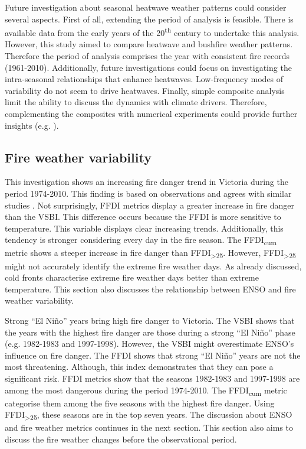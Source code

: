 Future investigation about seasonal heatwave weather patterns could
consider several aspects. First of all, extending the period of analysis
is feasible. There is available data from the early years of the 20\textsuperscript{th}
century to undertake this analysis. However, this study aimed to compare
heatwave and bushfire weather patterns. Therefore the period of analysis
comprises the year with consistent fire records (1961-2010). Additionally,
future investigations could focus on investigating the intra-seasonal
relationships that enhance heatwaves. Low-frequency modes of variability
do not seem to drive heatwaves. Finally, simple composite analysis
limit the ability to discuss the dynamics with climate drivers. Therefore,
complementing the composites with numerical experiments could provide
further insights (e.g. \citet{Sadler2012}). 


\subsection{Fire weather variability \label{sub:Seasonal-fire-weather-variability}}

This investigation shows an increasing fire danger trend in Victoria
during the period 1974-2010. This finding is based on observations
and agrees with similar studies \citep{Lucas2007,Lucas2010,Clarke2013}.
Not surprisingly, FFDI metrics display a greater increase in fire
danger than the VSBI. This difference occurs because the FFDI is more
sensitive to temperature. This variable displays clear increasing
trends. Additionally, this tendency is stronger considering every
day in the fire season. The FFDI\textsubscript{cum} metric shows
a steeper increase in fire danger than FFDI\textsubscript{>25}. However,
FFDI\textsubscript{>25} might not accurately identify the extreme
fire weather days. As already discussed, cold fronts characterise
extreme fire weather days better than extreme temperature. This section
also discusses the relationship between ENSO and fire weather variability. 

Strong \textquotedblleft El Ni\~no\textquotedblright{} years bring high
fire danger to Victoria. The VSBI shows that the years with the highest
fire danger are those during a strong \textquotedblleft El Ni\~no\textquotedblright{}
phase (e.g. 1982-1983 and 1997-1998). However, the VSBI might overestimate
ENSO's influence on fire danger. The FFDI shows that strong \textquotedblleft El
Ni\~no\textquotedblright{} years are not the most threatening. Although,
this index demonstrates that they can pose a significant risk. FFDI
metrics show that the seasons 1982-1983 and 1997-1998 are among the
most dangerous during the period 1974-2010. The FFDI\textsubscript{cum}
metric categorise them among the five seasons with the highest fire
danger. Using FFDI\textsubscript{>25}, these seasons are in the top
seven years. The discussion about ENSO and fire weather metrics continues
in the next section. This section also aims to discuss the fire weather
changes before the observational period.

